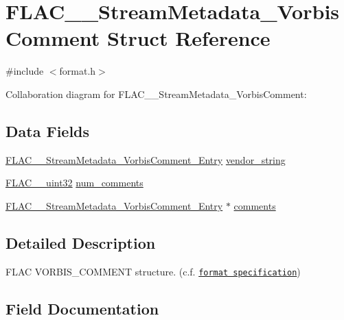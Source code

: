 \hypertarget{struct_f_l_a_c_____stream_metadata___vorbis_comment}{}\section{F\+L\+A\+C\+\_\+\+\_\+\+Stream\+Metadata\+\_\+\+Vorbis\+Comment Struct Reference}
\label{struct_f_l_a_c_____stream_metadata___vorbis_comment}


{\ttfamily \#include $<$format.\+h$>$}



Collaboration diagram for F\+L\+A\+C\+\_\+\+\_\+\+Stream\+Metadata\+\_\+\+Vorbis\+Comment\+:
\subsection*{Data Fields}
\begin{DoxyCompactItemize}
\item 
\hyperlink{struct_f_l_a_c_____stream_metadata___vorbis_comment___entry}{F\+L\+A\+C\+\_\+\+\_\+\+Stream\+Metadata\+\_\+\+Vorbis\+Comment\+\_\+\+Entry} \hyperlink{struct_f_l_a_c_____stream_metadata___vorbis_comment_a7a6dd7bacee57f0a59ac2d843cb79f98}{vendor\+\_\+string}
\item 
\hyperlink{ordinals_8h_a9c4005ea7ef8d564b0cc993cdd0e4e5e}{F\+L\+A\+C\+\_\+\+\_\+uint32} \hyperlink{struct_f_l_a_c_____stream_metadata___vorbis_comment_a6b5a521443691bc3f195c97b60203a3e}{num\+\_\+comments}
\item 
\hyperlink{struct_f_l_a_c_____stream_metadata___vorbis_comment___entry}{F\+L\+A\+C\+\_\+\+\_\+\+Stream\+Metadata\+\_\+\+Vorbis\+Comment\+\_\+\+Entry} $\ast$ \hyperlink{struct_f_l_a_c_____stream_metadata___vorbis_comment_ab4065e0e2fcaac759616e9e339acfa19}{comments}
\end{DoxyCompactItemize}


\subsection{Detailed Description}
F\+L\+AC V\+O\+R\+B\+I\+S\+\_\+\+C\+O\+M\+M\+E\+NT structure. (c.\+f. \href{../format.html#metadata_block_vorbis_comment}{\tt format specification}) 

\subsection{Field Documentation}
\mbox{\label{struct_f_l_a_c_____stream_metadata___vorbis_comment_ab4065e0e2fcaac759616e9e339acfa19}} 
